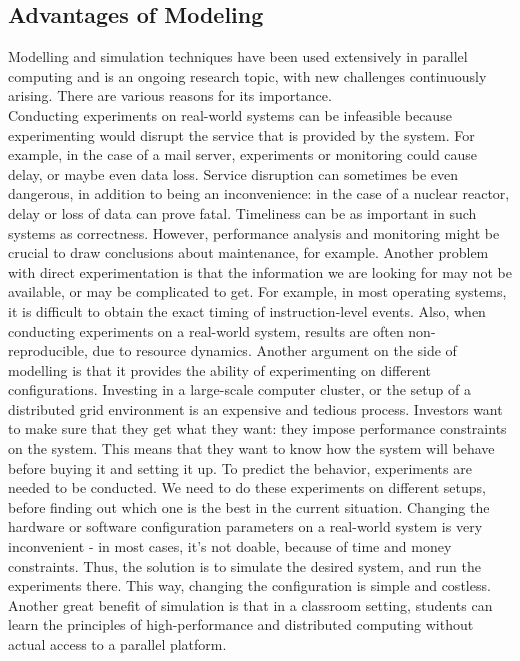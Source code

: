 \subsection{Advantages of Modeling}
Modelling and simulation techniques have been used extensively in
parallel computing and is an ongoing research topic, with new
challenges continuously arising. There are various reasons for its
importance.\\
Conducting experiments on real-world systems can be
infeasible because experimenting would disrupt the service that is
provided by the system. For example, in the case of a mail server,
experiments or monitoring could cause delay, or maybe even data
loss. Service disruption can sometimes be even dangerous, in addition
to being an inconvenience: in the case of a nuclear reactor, delay or
loss of data can prove fatal. Timeliness can be as important in such
systems as correctness. However, performance analysis and monitoring
might be crucial to draw conclusions about maintenance, for
example. Another problem with direct experimentation is that the
information we are looking for may not be available, or may be
complicated to get. For example, in most operating systems, it is
difficult to obtain the exact timing of instruction-level
events.\cite{h12_1} Also, when conducting experiments on a real-world
system, results are often non-reproducible, due to resource
dynamics.\cite{clq08} Another argument on the side of modelling is
that it provides the ability of experimenting on different
configurations. Investing in a large-scale computer cluster, or the
setup of a distributed grid environment is an expensive and tedious
process. Investors want to make sure that they get what they
want: they impose performance constraints on the system. This means
that they want to know how the system will behave
before buying it and setting it up. To predict the behavior,
experiments are needed to be conducted. We need to do these
experiments on different setups, before finding out which one is the
best in the current situation. Changing the hardware or software
configuration parameters on a real-world system is very inconvenient -
in most cases, it's not doable, because of time and money
constraints. Thus, the solution is to simulate the desired
system, and run the experiments there. This way, changing the
configuration is simple and costless.\cite{h12_1} Another great
benefit of simulation is that in a classroom setting, students can
learn the principles of high-performance and distributed computing
without actual access to a parallel platform.\cite{csgscq11}
